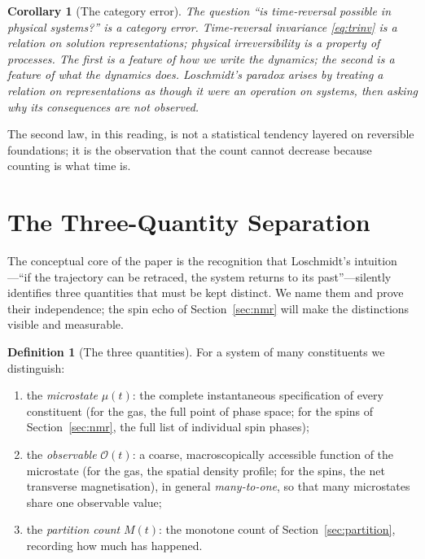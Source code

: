 \documentclass[11pt,a4paper]{article}
\theoremstyle{thmstyle}
\newtheorem{corollary}[theorem]{Corollary}
\theoremstyle{definition}
\newtheorem{definition}[theorem]{Definition}
\theoremstyle{remark}
\newcommand{\Count}{M}
\newcommand{\Obs}{\mathcal{O}}
\newcommand{\Mic}{\mu}
\begin{document}
\begin{corollary}[The category error]
\label{cor:category}
The question ``is time-reversal possible in physical systems?'' is a
category error. Time-reversal invariance \eqref{eq:trinv} is a relation
on solution representations; physical irreversibility is a property of
processes. The first is a feature of how we write the dynamics; the
second is a feature of what the dynamics does. Loschmidt's paradox arises
by treating a relation on representations as though it were an operation
on systems, then asking why its consequences are not observed.
\end{corollary}

The second law, in this reading, is not a statistical tendency layered on
reversible foundations; it is the observation that the count cannot
decrease because counting is what time is.

\section{The Three-Quantity Separation}
\label{sec:three-quantities}

The conceptual core of the paper is the recognition that Loschmidt's
intuition---``if the trajectory can be retraced, the system returns to
its past''---silently identifies three quantities that must be kept
distinct. We name them and prove their independence; the spin echo of
Section~\ref{sec:nmr} will make the distinctions visible and measurable.

\begin{definition}[The three quantities]
\label{def:three}
For a system of many constituents we distinguish:
\begin{enumerate}[leftmargin=1.7em,label=(\roman*),itemsep=0.2em]
\item the \emph{microstate} $\Mic(t)$: the complete instantaneous
specification of every constituent (for the gas, the full point of
phase space; for the spins of Section~\ref{sec:nmr}, the full list of
individual spin phases);
\item the \emph{observable} $\Obs(t)$: a coarse, macroscopically
accessible function of the microstate (for the gas, the spatial density
profile; for the spins, the net transverse magnetisation), in general
\emph{many-to-one}, so that many microstates share one observable value;
\item the \emph{partition count} $\Count(t)$: the monotone count of
Section~\ref{sec:partition}, recording how much has happened.
\end{enumerate}
\end{definition}
\end{document}
